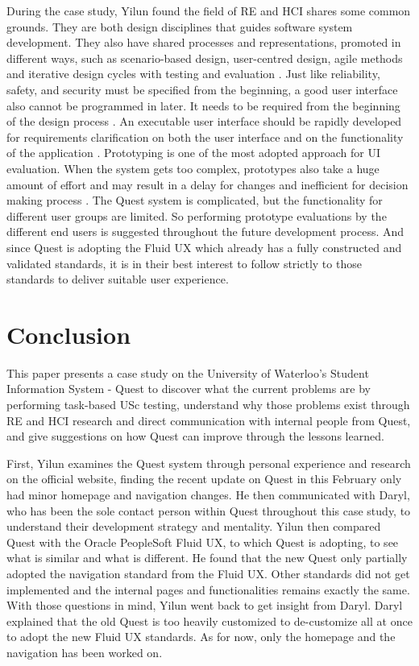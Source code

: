 \documentclass[conference]{IEEEtran}
\begin{document}
During the case study, Yilun found the field of RE and HCI shares some common grounds. They are both design disciplines that guides software system development. They also have shared processes and representations, promoted in different ways, such as scenario-based design, user-centred design, agile methods and iterative design cycles with testing and evaluation \cite{b20}. Just like reliability, safety, and security  must be specified from the beginning, a good user interface also cannot be programmed in later. It needs to be required from the beginning of the design process \cite{b21}. An executable user interface should be rapidly developed for requirements clarification on both the user interface and on the functionality of the application \cite{b21}. Prototyping is one of the most adopted approach for UI evaluation. When the system gets too complex, prototypes also take a huge amount of effort and may result in a delay for changes and inefficient for decision making process \cite{b21}. The Quest system is complicated, but the functionality for different user groups are limited. So performing prototype evaluations by the different end users is suggested throughout the future development process. And since Quest is adopting the Fluid UX which already has a fully constructed and validated standards, it is in their best interest to follow strictly to those standards to deliver suitable user experience.


\section{Conclusion}  \label{conclusion}
This paper presents a case study on the University of Waterloo's Student Information System - Quest to discover what the current problems are by performing task-based USc testing, understand why those problems exist through RE and HCI research and direct communication with internal people from Quest, and give suggestions on how Quest can improve through the lessons learned.

First, Yilun examines the Quest system through personal experience and research on the official website, finding the recent update on Quest in this February only had minor homepage and navigation changes. He then communicated with Daryl, who has been the sole contact person within Quest throughout this case study, to understand their development strategy and mentality. Yilun then compared Quest with the Oracle PeopleSoft Fluid UX, to which Quest is adopting, to see what is similar and what is different. He found that the new Quest only partially adopted the navigation standard from the Fluid UX. Other standards did not get implemented and the internal pages and functionalities remains exactly the same. With those questions in mind, Yilun went back to get insight from Daryl. Daryl explained that the old Quest is too heavily customized to de-customize all at once to adopt the new Fluid UX standards. As for now, only the homepage and the navigation has been worked on.
\end{document}
